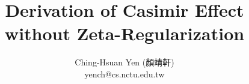 \documentclass[twocolumn]{revtex4-2}
\begin{document}
\title{Derivation of Casimir Effect without Zeta-Regularization}
\author{Ching-Hsuan Yen (顏靖軒) \\ yench@cs.nctu.edu.tw }
\begin{abstract}
    
\end{abstract}
\maketitle





\end{document}
